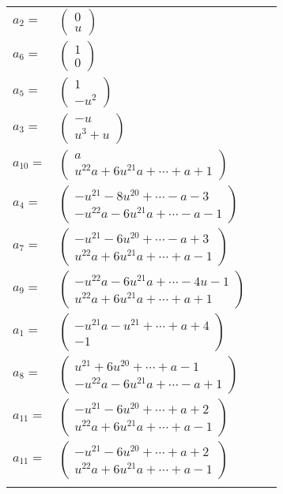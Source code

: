 \documentclass[1p]{elsarticle_modified}
\theoremstyle{definition}
\begin{document}
\begin{tabular}{m{7pt} m{180pt} m{7pt} m{180pt} }
\flushright $a_{2}=$&$\begin{pmatrix}0\\u\end{pmatrix}$ \\
\flushright $a_{6}=$&$\begin{pmatrix}1\\0\end{pmatrix}$ \\
\flushright $a_{5}=$&$\begin{pmatrix}1\\- u^2\end{pmatrix}$ \\
\flushright $a_{3}=$&$\begin{pmatrix}- u\\u^3+u\end{pmatrix}$ \\
\flushright $a_{10}=$&$\begin{pmatrix}a\\u^{22} a+6 u^{21} a+\cdots+a+1\end{pmatrix}$ \\
\flushright $a_{4}=$&$\begin{pmatrix}- u^{21}-8 u^{20}+\cdots- a-3\\- u^{22} a-6 u^{21} a+\cdots- a-1\end{pmatrix}$ \\
\flushright $a_{7}=$&$\begin{pmatrix}- u^{21}-6 u^{20}+\cdots- a+3\\u^{22} a+6 u^{21} a+\cdots+a-1\end{pmatrix}$ \\
\flushright $a_{9}=$&$\begin{pmatrix}- u^{22} a-6 u^{21} a+\cdots-4 u-1\\u^{22} a+6 u^{21} a+\cdots+a+1\end{pmatrix}$ \\
\flushright $a_{1}=$&$\begin{pmatrix}- u^{21} a- u^{21}+\cdots+a+4\\-1\end{pmatrix}$ \\
\flushright $a_{8}=$&$\begin{pmatrix}u^{21}+6 u^{20}+\cdots+a-1\\- u^{22} a-6 u^{21} a+\cdots- a+1\end{pmatrix}$ \\
\flushright $a_{11}=$&$\begin{pmatrix}- u^{21}-6 u^{20}+\cdots+a+2\\u^{22} a+6 u^{21} a+\cdots+a-1\end{pmatrix}$\\ \flushright $a_{11}=$&$\begin{pmatrix}- u^{21}-6 u^{20}+\cdots+a+2\\u^{22} a+6 u^{21} a+\cdots+a-1\end{pmatrix}$\\&\end{tabular}
\end{document}
